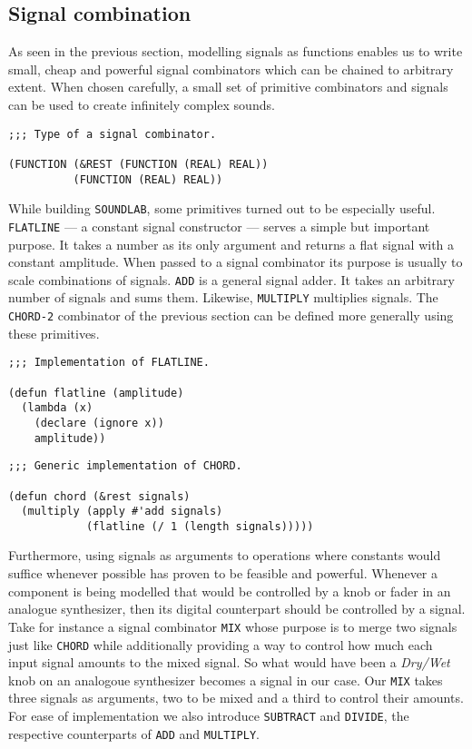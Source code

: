 \subsection{Signal combination}

As seen in the previous section, modelling signals as functions
enables us to write small, cheap and powerful signal combinators which
can be chained to arbitrary extent. When chosen carefully, a small set of
primitive combinators and signals can be used to create infinitely
complex sounds.

\begin{verbatim}
;;; Type of a signal combinator.

(FUNCTION (&REST (FUNCTION (REAL) REAL))
          (FUNCTION (REAL) REAL))
\end{verbatim}

While building \texttt{SOUNDLAB}, some primitives turned out to be
especially useful. \texttt{FLATLINE} --- a constant signal constructor
--- serves a simple but important purpose. It takes a number as its only
argument and returns a flat signal with a constant amplitude. When passed
to a signal combinator its purpose is usually to scale combinations of
signals. \texttt{ADD} is a general signal adder. It takes an arbitrary
number of signals and sums them. Likewise, \texttt{MULTIPLY} multiplies
signals. The \texttt{CHORD-2} combinator of the previous section can be
defined more generally using these primitives.

\begin{verbatim}
;;; Implementation of FLATLINE.

(defun flatline (amplitude)
  (lambda (x)
    (declare (ignore x))
    amplitude))
\end{verbatim}

\begin{verbatim}
;;; Generic implementation of CHORD.

(defun chord (&rest signals)
  (multiply (apply #'add signals)
            (flatline (/ 1 (length signals)))))
\end{verbatim}

Furthermore, using signals as arguments to operations where constants
would suffice whenever possible has proven to be feasible and powerful.
Whenever a component is being modelled that would be controlled by a knob
or fader in an analogue synthesizer, then its digital counterpart should
be controlled by a signal. Take for instance a signal combinator
\texttt{MIX} whose purpose is to merge two signals just like
\texttt{CHORD} while additionally providing a way to control how much
each input signal amounts to the mixed signal. So what would have been a
\textit{Dry/Wet} knob on an analogoue synthesizer becomes a signal in our
case. Our \texttt{MIX} takes three signals as arguments, two to be mixed
and a third to control their amounts. For ease of implementation we also
introduce \texttt{SUBTRACT} and \texttt{DIVIDE}, the respective
counterparts of \texttt{ADD} and \texttt{MULTIPLY}.

